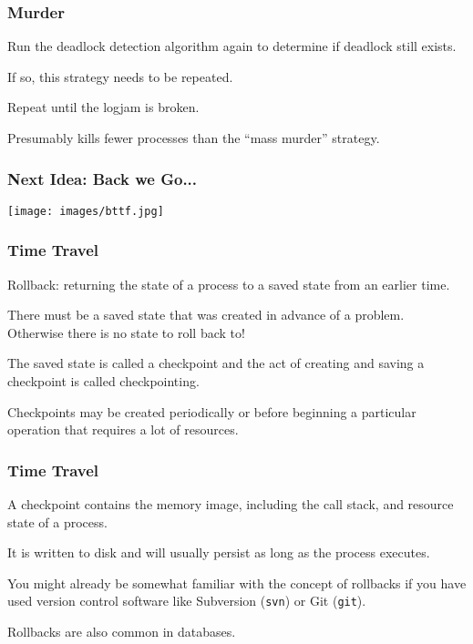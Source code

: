 \begin{frame}
	\frametitle{Murder}
	Run the deadlock detection algorithm again to determine if deadlock still exists.

	If so, this strategy needs to be repeated.

	Repeat until the logjam is broken.

	Presumably kills fewer processes than the ``mass murder'' strategy.

\end{frame}


\begin{frame}
	\frametitle{Next Idea: Back we Go...}

	\begin{center}
		\texttt{[image: images/bttf.jpg]}
	\end{center}

\end{frame}


\begin{frame}
	\frametitle{Time Travel}

	\alert{Rollback}: returning the state of a process to a saved state from an earlier time.

	There must be a saved state that was created in advance of a problem. \\
	\quad Otherwise there is no state to roll back to!

	The saved state is called a \alert{checkpoint} and the act of creating and saving a checkpoint is called \alert{checkpointing}.

	Checkpoints may be created periodically or before beginning a particular operation that requires a lot of resources.

\end{frame}

\begin{frame}
	\frametitle{Time Travel}

	A checkpoint contains the memory image, including the call stack, and resource state of a process.

	It is written to disk and will usually persist as long as the process executes.

	You might already be somewhat familiar with the concept of rollbacks if you have used version control software like Subversion (\texttt{svn}) or Git (\texttt{git}).

	Rollbacks are also common in databases.

\end{frame}

